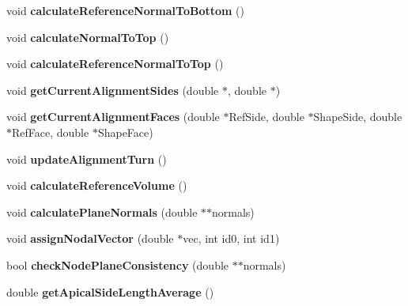 \begin{DoxyCompactItemize}
\item 
\hypertarget{classPrism_a2d8821dcd96009c95f06f34ee23ede7e}{}void {\bfseries calculate\+Reference\+Normal\+To\+Bottom} ()\label{classPrism_a2d8821dcd96009c95f06f34ee23ede7e}

\item 
\hypertarget{classPrism_ac3b85296d366eb4dd67406228c519caf}{}void {\bfseries calculate\+Normal\+To\+Top} ()\label{classPrism_ac3b85296d366eb4dd67406228c519caf}

\item 
\hypertarget{classPrism_a41a101de7bb2f75c5f9b44de23187593}{}void {\bfseries calculate\+Reference\+Normal\+To\+Top} ()\label{classPrism_a41a101de7bb2f75c5f9b44de23187593}

\item 
\hypertarget{classPrism_a6144314003601a688d81b0389ea1114e}{}void {\bfseries get\+Current\+Alignment\+Sides} (double $\ast$, double $\ast$)\label{classPrism_a6144314003601a688d81b0389ea1114e}

\item 
\hypertarget{classPrism_ab5fa417d944a6903b5bc9d2f53d4616a}{}void {\bfseries get\+Current\+Alignment\+Faces} (double $\ast$Ref\+Side, double $\ast$Shape\+Side, double $\ast$Ref\+Face, double $\ast$Shape\+Face)\label{classPrism_ab5fa417d944a6903b5bc9d2f53d4616a}

\item 
\hypertarget{classPrism_a4472375144e5e38a912af1fb4e2cc2d1}{}void {\bfseries update\+Alignment\+Turn} ()\label{classPrism_a4472375144e5e38a912af1fb4e2cc2d1}

\item 
\hypertarget{classPrism_a4ea58fd729a2bbef20530200978a8f75}{}void {\bfseries calculate\+Reference\+Volume} ()\label{classPrism_a4ea58fd729a2bbef20530200978a8f75}

\item 
\hypertarget{classPrism_a6b273d198e94039758a027b0dfb2c8af}{}void {\bfseries calculate\+Plane\+Normals} (double $\ast$$\ast$normals)\label{classPrism_a6b273d198e94039758a027b0dfb2c8af}

\item 
\hypertarget{classPrism_a13de4e8cefb58b3a33de4c2f7265a3b0}{}void {\bfseries assign\+Nodal\+Vector} (double $\ast$vec, int id0, int id1)\label{classPrism_a13de4e8cefb58b3a33de4c2f7265a3b0}

\item 
\hypertarget{classPrism_ac9695169749356654e847a022ce29aff}{}bool {\bfseries check\+Node\+Plane\+Consistency} (double $\ast$$\ast$normals)\label{classPrism_ac9695169749356654e847a022ce29aff}

\item 
\hypertarget{classPrism_acc59ccf5e1b5f459a8fb871c2a78fe8e}{}double {\bfseries get\+Apical\+Side\+Length\+Average} ()\label{classPrism_acc59ccf5e1b5f459a8fb871c2a78fe8e}

\end{DoxyCompactItemize}
